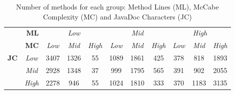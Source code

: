 \begin{table}[ht]
    \setlength{\tabcolsep}{3.5pt}

\begin{tabular}{cc|ccc|ccc|ccc|}
\cline{3-11}
\multicolumn{2}{r|}{\textbf{ML}}                                  & \multicolumn{3}{c|}{\textit{Low}}                                                     & \multicolumn{3}{c|}{\textit{Mid}}                                                     & \multicolumn{3}{c|}{\textit{High}}                                                    \\ \cline{3-11} 
\multicolumn{2}{r|}{\textbf{MC}}                                  & \multicolumn{1}{c|}{\textit{Low}} & \multicolumn{1}{c|}{\textit{Mid}} & \textit{High} & \multicolumn{1}{c|}{\textit{Low}} & \multicolumn{1}{c|}{\textit{Mid}} & \textit{High} & \multicolumn{1}{c|}{\textit{Low}} & \multicolumn{1}{c|}{\textit{Mid}} & \textit{High} \\ \cline{2-11} 
\multicolumn{1}{c|}{\multirow{3}{*}{\textbf{JC}}} & \textit{Low}  & \multicolumn{1}{c|}{3407}         & \multicolumn{1}{c|}{1326}         & 55            & \multicolumn{1}{c|}{1089}         & \multicolumn{1}{c|}{1861}         & 425           & \multicolumn{1}{c|}{378}          & \multicolumn{1}{c|}{818}          & 1893          \\ \cline{2-11} 
\multicolumn{1}{c|}{}                             & \textit{Mid}  & \multicolumn{1}{c|}{2928}         & \multicolumn{1}{c|}{1348}         & 37            & \multicolumn{1}{c|}{999}          & \multicolumn{1}{c|}{1795}         & 565           & \multicolumn{1}{c|}{391}          & \multicolumn{1}{c|}{902}          & 2055          \\ \cline{2-11} 
\multicolumn{1}{c|}{}                             & \textit{High} & \multicolumn{1}{c|}{2278}         & \multicolumn{1}{c|}{946}          & 55            & \multicolumn{1}{c|}{1024}         & \multicolumn{1}{c|}{1810}         & 333           & \multicolumn{1}{c|}{370}          & \multicolumn{1}{c|}{1183}         & 3135          \\ \cline{2-11} 
\end{tabular}
\vspace*{1mm}
\caption{Number of methods for each group: Method Lines (ML), McCabe Complexity (MC) and JavaDoc Characters (JC)} \label{tab:groups}
\end{table}